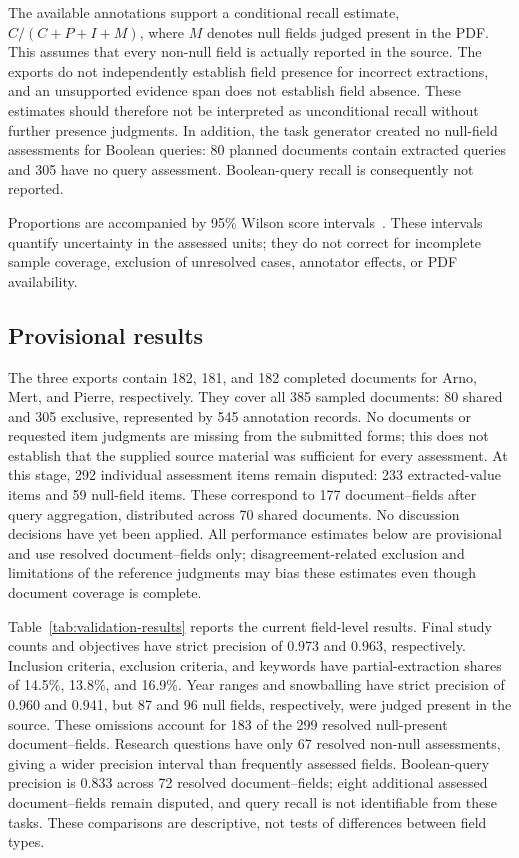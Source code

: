The available annotations support a conditional recall estimate, $C/(C+P+I+M)$, where $M$ denotes null fields judged present in the PDF. This assumes that every non-null field is actually reported in the source. The exports do not independently establish field presence for incorrect extractions, and an unsupported evidence span does not establish field absence. These estimates should therefore not be interpreted as unconditional recall without further presence judgments. In addition, the task generator created no null-field assessments for Boolean queries: 80 planned documents contain extracted queries and 305 have no query assessment. Boolean-query recall is consequently not reported.

Proportions are accompanied by 95\% Wilson score intervals~\cite{wilson:1927,brown:2001}. These intervals quantify uncertainty in the assessed units; they do not correct for incomplete sample coverage, exclusion of unresolved cases, annotator effects, or PDF availability.

\subsection*{Provisional results}
The three exports contain 182, 181, and 182 completed documents for Arno, Mert, and Pierre, respectively. They cover all 385 sampled documents: 80 shared and 305 exclusive, represented by 545 annotation records. No documents or requested item judgments are missing from the submitted forms; this does not establish that the supplied source material was sufficient for every assessment. At this stage, 292 individual assessment items remain disputed: 233 extracted-value items and 59 null-field items. These correspond to 177 document--fields after query aggregation, distributed across 70 shared documents. No discussion decisions have yet been applied. All performance estimates below are provisional and use resolved document--fields only; disagreement-related exclusion and limitations of the reference judgments may bias these estimates even though document coverage is complete.

Table~\ref{tab:validation-results} reports the current field-level results. Final study counts and objectives have strict precision of 0.973 and 0.963, respectively. Inclusion criteria, exclusion criteria, and keywords have partial-extraction shares of 14.5\%, 13.8\%, and 16.9\%. Year ranges and snowballing have strict precision of 0.960 and 0.941, but 87 and 96 null fields, respectively, were judged present in the source. These omissions account for 183 of the 299 resolved null-present document--fields. Research questions have only 67 resolved non-null assessments, giving a wider precision interval than frequently assessed fields. Boolean-query precision is 0.833 across 72 resolved document--fields; eight additional assessed document--fields remain disputed, and query recall is not identifiable from these tasks. These comparisons are descriptive, not tests of differences between field types.

